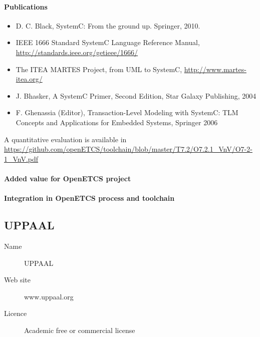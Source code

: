 \paragraph{Publications} 

\begin{itemize}
\item D. C. Black, SystemC: From the ground up. Springer, 2010.
\item IEEE 1666 Standard SystemC Language Reference Manual, \url{http://standards.ieee.org/getieee/1666/}
\item The ITEA MARTES Project, from UML to SystemC, \url{http://www.martes-itea.org/}
\item J. Bhasker, A SystemC Primer, Second Edition, Star Galaxy Publishing, 2004
\item F. Ghenassia (Editor), Transaction-Level Modeling with SystemC: TLM Concepts and
Applications for Embedded Systems, Springer 2006
\end{itemize}


A quantitative evaluation is available in \url{https://github.com/openETCS/toolchain/blob/master/T7.2/O7.2.1_VnV/O7-2-1_VnV.pdf}

\paragraph{Added value for OpenETCS project}

\begin{comment}
To complete: Stefan Rieger  ?
\end{comment}


\paragraph{Integration in OpenETCS process and toolchain}

\begin{comment}
To complete: Stefan Rieger  ?
\end{comment}


\subsection{UPPAAL}

\begin{description}
\item[Name] UPPAAL
\item[Web site] www.uppaal.org
\item[Licence] Academic free or commercial license
\end{description}

